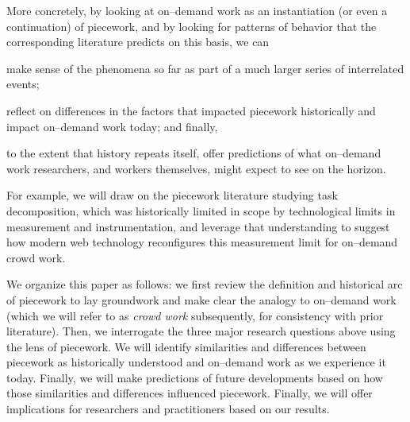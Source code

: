 \documentclass[trackingWork]{subfiles}
\begin{document}
More concretely, by looking at on--demand work as
an instantiation (or even a continuation) of piecework,
and by looking for patterns of behavior that the corresponding literature predicts
on this basis, we can
\begin{inlinelist}
  \item make sense of the phenomena so far as part of a much larger series of interrelated events;
  \item reflect on differences in the factors that impacted piecework historically and impact on--demand work today;
        and finally,
  \item to the extent that history repeats itself, offer predictions of what on--demand work researchers,
        and workers themselves,
        might expect to see on the horizon.
\end{inlinelist}
For example, we will draw on the piecework literature studying task decomposition, which was historically limited in scope by technological limits in measurement and instrumentation, and leverage that understanding to suggest how modern web technology reconfigures this measurement limit for on--demand crowd work.


We organize this paper as follows: we first review the definition and historical arc of piecework to lay  groundwork and make clear the analogy to on--demand work (which we will refer to as \textit{crowd work} subsequently, for consistency with prior literature). Then, we interrogate the three major research questions above using the lens of piecework. 
We will identify similarities and differences between piecework as historically understood and
on--demand work as we experience it today.
Finally, we will make predictions of future developments based on how those similarities and differences influenced piecework.
Finally, we will offer implications for researchers and practitioners based on our results.


\onlyinsubfile{
  \balance{}
  \printbibliography
}
\end{document}
